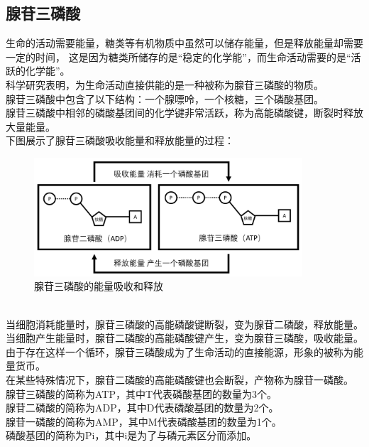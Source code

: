 \documentclass[UTF8]{ctexart}
\begin{document}
\newpage
    
\subsection{腺苷三磷酸}
    生命的活动需要能量，糖类等有机物质中虽然可以储存能量，但是释放能量却需要一定的时间，
    这是因为糖类所储存的是“稳定的化学能”，而生命活动需要的是“活跃的化学能”。\\[3mm]
    科学研究表明，为生命活动直接供能的是一种被称为腺苷三磷酸的物质。\\[3mm]
    腺苷三磷酸中包含了以下结构：一个腺嘌呤，一个核糖，三个磷酸基团。\\[3mm]
    腺苷三磷酸中相邻的磷酸基团间的化学键非常活跃，称为高能磷酸键，断裂时释放大量能量。\\[6mm]
    下图展示了腺苷三磷酸吸收能量和释放能量的过程：\vspace{5pt}
    \begin{figure}[h!]
        \begin{center}
            \includegraphics[width=10cm]{BiologyImage/11.jpg}
            \caption{腺苷三磷酸的能量吸收和释放}
        \end{center}
    \end{figure}\\
    当细胞消耗能量时，腺苷三磷酸的高能磷酸键断裂，变为腺苷二磷酸，释放能量。\\[3mm]
    当细胞产生能量时，腺苷二磷酸的高能磷酸键产生，变为腺苷三磷酸，吸收能量。\\[3mm]
    由于存在这样一个循环，腺苷三磷酸成为了生命活动的直接能源，形象的被称为能量货币。\\[3mm]
    在某些特殊情况下，腺苷二磷酸的高能磷酸键也会断裂，产物称为腺苷一磷酸。\\[6mm]
    腺苷三磷酸的简称为ATP，其中T代表磷酸基团的数量为3个。\\[3mm]
    腺苷二磷酸的简称为ADP，其中D代表磷酸基团的数量为2个。\\[3mm]
    腺苷一磷酸的简称为AMP，其中M代表磷酸基团的数量为1个。\\[3mm]
    磷酸基团的简称为Pi，其中i是为了与磷元素区分而添加。
    
\end{document}
